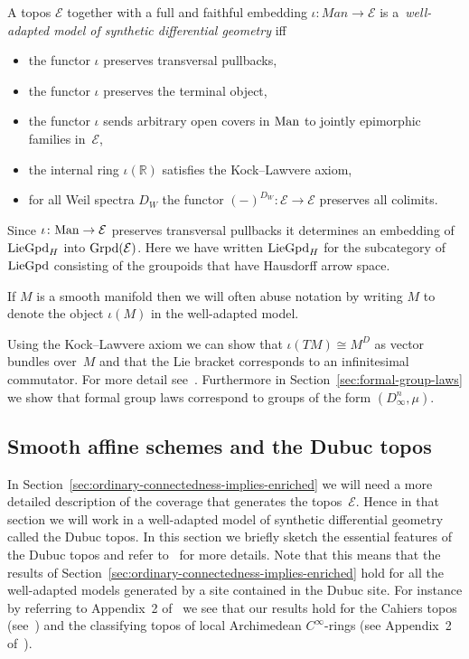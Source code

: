 \documentclass[10pt,a4paper]{amsart}
\numberwithin{equation}{section}
\begin{document}
\begin{Definition}A topos $\mathcal{E}$ together with a full and faithful embedding $\iota\colon Man\rightarrow \mathcal{E}$ is a~\emph{well-adapted model of synthetic differential geometry} if\/f
\begin{itemize}\itemsep=0pt
\item the functor $\iota$ preserves transversal pullbacks,
\item the functor $\iota$ preserves the terminal object,
\item the functor $\iota$ sends arbitrary open covers in ${\rm Man}$ to jointly epimorphic families in~$\mathcal{E}$,
\item the internal ring $\iota(\mathbb{R})$ satisf\/ies the Kock--Lawvere axiom,
\item for all Weil spectra $D_W$ the functor $(-)^{D_W}\colon \mathcal{E}\rightarrow \mathcal{E}$ preserves all colimits.
\end{itemize}
\end{Definition}

\begin{Remark}Since $\iota\colon {\rm Man} \rightarrow \mathcal{E}$ preserves transversal pullbacks it determines an embedding of ${\rm LieGpd}_H$ into ${\rm Grpd}(\mathcal{E})$. Here we have written ${\rm LieGpd}_H$ for the subcategory of ${\rm LieGpd}$ consisting of the groupoids that have Hausdorf\/f arrow space.
\end{Remark}

\begin{Remark}If $M$ is a smooth manifold then we will often abuse notation by writing $M$ to denote the object $\iota(M)$ in the well-adapted model.
\end{Remark}

Using the Kock--Lawvere axiom we can show that $\iota(TM)\cong M^D$ as vector bundles over~$M$ and that the Lie bracket corresponds to an inf\/initesimal commutator. For more detail see~\cite{MR2244115}. Further\-more in Section~\ref{sec:formal-group-laws} we show that formal group laws correspond to groups of the form $(D_{\infty}^n,\mu)$.

\subsection{Smooth af\/f\/ine schemes and the Dubuc topos}\label{sec:dubuc-topos}

In Section~\ref{sec:ordinary-connectedness-implies-enriched} we will need a more detailed description of the coverage that generates the topos~$\mathcal{E}$. Hence in that section we will work in a well-adapted model of synthetic dif\/ferential geometry called the Dubuc topos. In this section we brief\/ly sketch the essential features of the Dubuc topos and refer to~\cite{1981EduardoJDubuc80} for more details. Note that this means that the results of Section~\ref{sec:ordinary-connectedness-implies-enriched} hold for all the well-adapted models generated by a site contained in the Dubuc site. For instance by referring to Appendix~2 of~\cite{MR1083355} we see that our results hold for the Cahiers topos (see~\cite{MR557083}) and the classifying topos of local Archimedean $C^{\infty}$-rings (see Appendix~2 of~\cite{MR1083355}).
\end{document}
